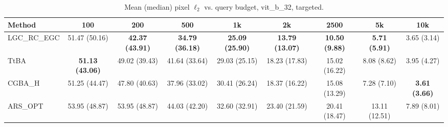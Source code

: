 \begin{table}[t]
\centering\footnotesize
\caption{Mean (median) pixel $\ell_2$ vs. query budget, vit\_b\_32, targeted.}
\begin{tabular}{lcccccccc}
\toprule
Method & 100 & 200 & 500 & 1k & 2k & 2500 & 5k & 10k \\
\midrule
LGC\_RC\_EGC & 51.47 (50.16) & \textbf{42.37 (43.91)} & \textbf{34.79 (36.18)} & \textbf{25.09 (25.90)} & \textbf{13.79 (13.07)} & \textbf{10.50 (9.88)} & \textbf{5.71 (5.91)} & 3.65 (3.14) \\
TtBA & \textbf{51.13 (43.06)} & 49.02 (39.43) & 41.64 (33.64) & 29.03 (25.15) & 18.23 (17.83) & 15.02 (16.22) & 8.08 (8.62) & 3.95 (4.27) \\
CGBA\_H & 51.25 (44.47) & 47.80 (40.63) & 37.96 (33.02) & 30.41 (26.24) & 18.37 (16.22) & 15.08 (13.29) & 7.28 (7.10) & \textbf{3.61 (3.66)} \\
ARS\_OPT & 53.95 (48.87) & 53.95 (48.87) & 44.03 (42.20) & 32.60 (32.91) & 23.40 (21.59) & 20.41 (18.47) & 13.11 (12.51) & 7.89 (8.01) \\
\bottomrule
\end{tabular}
\end{table}
